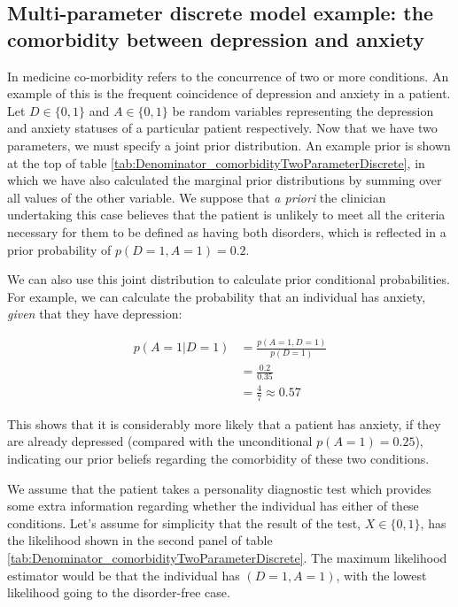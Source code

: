 \documentclass[11pt,fullpage]{book}
\begin{document}
\subsection{Multi-parameter discrete model example: the comorbidity between depression and anxiety}\label{sec:Denominator_comorbidityTwoParameterDiscrete}
In medicine co-morbidity refers to the concurrence of two or more conditions. An example of this is the frequent coincidence of depression and anxiety in a patient. Let $D\in\{0,1\}$ and $A\in\{0,1\}$ be random variables representing the depression and anxiety statuses of a particular patient respectively. Now that we have two parameters, we must specify a joint prior distribution. An example prior is shown at the top of table \ref{tab:Denominator_comorbidityTwoParameterDiscrete}, in which we have also calculated the marginal prior distributions by summing over all values of the other variable. We suppose that \textit{a priori} the clinician undertaking this case believes that the patient is unlikely to meet all the criteria necessary for them to be defined as having both disorders, which is reflected in a prior probability of $p(D=1,A=1)=0.2$.

We can also use this joint distribution to calculate prior conditional probabilities. For example, we can calculate the probability that an individual has anxiety, \textit{given} that they have depression:

\begin{equation}
\begin{align}
p(A=1|D=1) &= \frac{p(A=1,D=1)}{p(D=1)}\\
&= \frac{0.2}{0.35}\\
&=\frac{4}{7}\approx 0.57
\end{align}
\end{equation}

This shows that it is considerably more likely that a patient has anxiety, if they are already depressed (compared with the unconditional $p(A=1)=0.25$), indicating our prior beliefs regarding the comorbidity of these two conditions.

We assume that the patient takes a personality diagnostic test which provides some extra information regarding whether the individual has either of these conditions. Let's assume for simplicity that the result of the test, $X\in\{0,1\}$, has the likelihood shown in the second panel of table \ref{tab:Denominator_comorbidityTwoParameterDiscrete}. The maximum likelihood estimator would be that the individual has $(D=1,A=1)$, with the lowest likelihood going to the disorder-free case.
\end{document}
